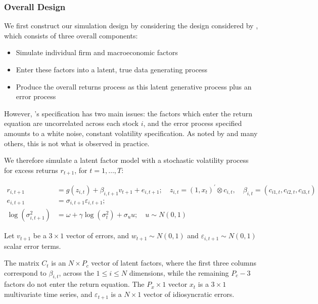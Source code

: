 \documentclass[11pt, a4paper, table]{article}
\begin{document}
\subsubsection{Overall Design}

We first construct our simulation design by considering the design considered by \cite{gu_empirical_2018}, which consists of three overall components:
\begin{itemize}
	\item Simulate individual firm and macroeconomic factors
	\item Enter these factors into a latent, true data generating process
	\item Produce the overall returns process as this latent generative process plus an error process
\end{itemize}

However, \cite{gu_empirical_2018}'s specification has two main issues: the factors which enter the return equation are uncorrelated across each stock $i$, and the error process specified amounts to a white noise, constant volatility specification. As noted by \cite{harvey__2016} and many others, this is not what is observed in practice. 

We therefore simulate a latent factor model with a stochastic volatility process for excess returns  $r_{t+1}$, for $t=1,\dots,T$:

\begin{align}
r_{i, t+1} &= 
g\left(z_{i, t}\right) + \beta_{i,t+1}v_{t+1} + e_{i, t+1}; 
	\quad z_{i, t}=\left(1, x_{t}\right)^{\prime} \otimes c_{i, t}, 
		\quad \beta_{i, t}=\left(c_{i 1, t}, c_{i 2, t}, c_{i 3, t}\right) \\ 
e_{i, t+1} &= 
	\sigma_{i, t+1} \varepsilon_{i, t+1}; \\
\operatorname{log} (\sigma^2_{i,t+1}) &= 
	\omega + \gamma \operatorname{log} (\sigma^2_{t}) + \sigma_{u}u; 
	\quad u \sim N(0, 1)
\end{align}

Let $v_{t+1}$ be a $3\times 1$ vector of errors, and $w_{t+1} \sim N(0, 1)$ and $\varepsilon_{i,t+1} \sim N(0, 1)$ scalar error terms. 

The matrix $C_t$ is an $N\times P_c$ vector of latent factors, where the first three columns correspond to $\beta_{i,t}$, across the $1\leq i\leq N$ dimensions, while the remaining $P_c-3$ factors do not enter the return equation. The $P_x\times1$ vector $x_t$ is a $3 \times 1$ multivariate time series, and $\varepsilon_{t+1}$ is a $N\times 1$ vector of idiosyncratic errors. 
\end{document}
